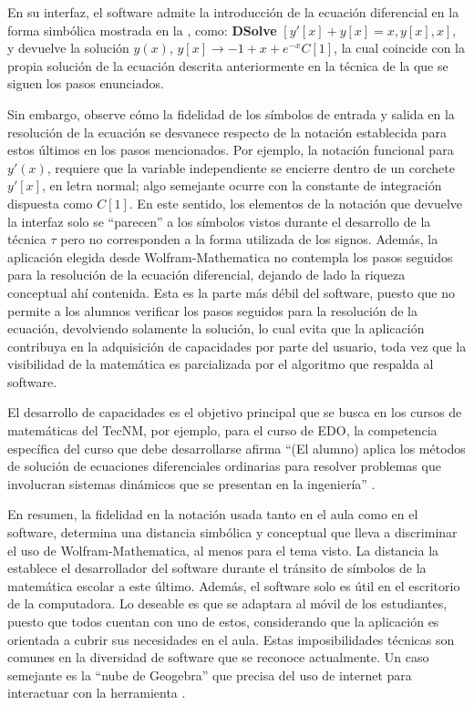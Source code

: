 \documentclass[spanish]{textolivre}
\begin{document}
En su interfaz, el software admite la introducción de la ecuación diferencial en la forma simbólica mostrada en la , como: \textbf{DSolve} $[y'[x]+y[x]=x, y[x], x]$, y devuelve la solución $y(x)$, ${{y[x] \rightarrow -1+x+e^{-x} C[1]}}$, la cual coincide con la propia solución de la ecuación descrita anteriormente en la técnica de la que se siguen los pasos enunciados. 

Sin embargo, observe cómo la fidelidad de los símbolos de entrada y salida en la resolución de la ecuación se desvanece respecto de la notación establecida para estos últimos en los pasos mencionados. Por ejemplo, la notación funcional para $y'(x)$, requiere que la variable independiente se encierre dentro de un corchete $y'[x]$, en letra normal; algo semejante ocurre con la constante de integración dispuesta como $C[1]$. En este sentido, los elementos de la notación que devuelve la interfaz solo se “parecen” a los símbolos vistos durante el desarrollo de la técnica $\tau$ pero no corresponden a la forma utilizada de los signos. Además, la aplicación elegida desde Wolfram-Mathematica no contempla los pasos seguidos para la resolución de la ecuación diferencial, dejando de lado la riqueza conceptual ahí contenida. Esta es la parte más débil del software, puesto que no permite a los alumnos verificar los pasos seguidos para la resolución de la ecuación, devolviendo solamente la solución, lo cual evita que la aplicación contribuya en la adquisición de capacidades por parte del usuario, toda vez que la visibilidad de la matemática es parcializada por el algoritmo que respalda al software.

El desarrollo de capacidades es el objetivo principal que se busca en los cursos de matemáticas del TecNM, por ejemplo, para el curso de EDO, la competencia específica del curso que debe desarrollarse afirma “(El alumno) aplica los métodos de solución de ecuaciones diferenciales ordinarias para resolver problemas que involucran sistemas dinámicos que se presentan en la ingeniería” \cite{tecnologico_nacional_de_mexico_tecnm_ecuaciones_2016}.

En resumen, la fidelidad en la notación usada tanto en el aula como en el software, determina una distancia simbólica y conceptual que lleva a discriminar el uso de Wolfram-Mathematica, al menos para el tema visto. La distancia la establece el desarrollador del software durante el tránsito de símbolos de la matemática escolar a este último. Además, el software solo es útil en el escritorio de la computadora. Lo deseable es que se adaptara al móvil de los estudiantes, puesto que todos cuentan con uno de estos, considerando que la aplicación es orientada a cubrir sus necesidades en el aula. Estas imposibilidades técnicas son comunes en la diversidad de software que se reconoce actualmente. Un caso semejante es la “nube de Geogebra” que precisa del uso de internet para interactuar con la herramienta \cite{salas2018}.
\end{document}
